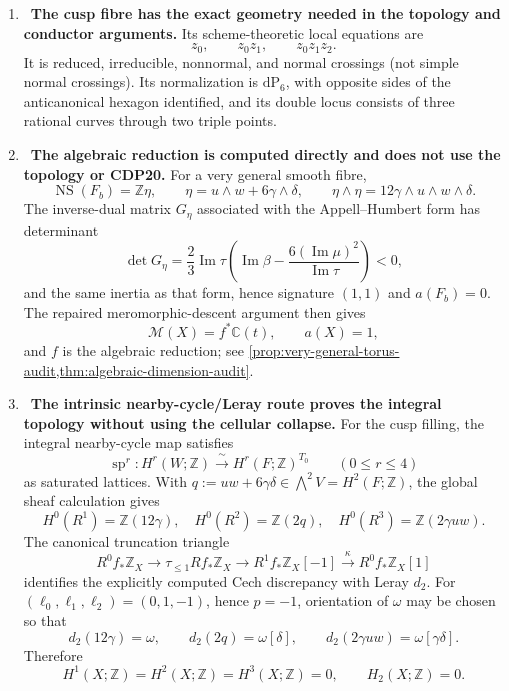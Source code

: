 \begin{enumerate}[leftmargin=1.8em,itemsep=.65em]
\item \Verified\ \textbf{The cusp fibre has the exact geometry needed in the
topology and conductor arguments.}
Its scheme-theoretic local equations are
\[
 z_0,\qquad z_0z_1,\qquad z_0z_1z_2.
\]
It is reduced, irreducible, nonnormal, and normal crossings (not simple
normal crossings).  Its normalization is \(\mathrm{dP}_6\), with opposite
sides of the anticanonical hexagon identified, and its double locus consists
of three rational curves through two triple points.

\item \Verified\ \textbf{The algebraic reduction is computed directly and
does not use the topology or CDP20.}
For a very general smooth fibre,
\[
 \operatorname{NS}(F_b)=\mathbb Z\eta,\qquad
 \eta=u\wedge w+6\gamma\wedge\delta,\qquad
 \eta\wedge\eta=12\gamma\wedge u\wedge w\wedge\delta.
\]
The inverse-dual matrix \(G_\eta\) associated with the Appell--Humbert form
has determinant
\[
 \det G_\eta=
 \frac23\operatorname{Im}\tau
 \left(\operatorname{Im}\beta-
 \frac{6(\operatorname{Im}\mu)^2}{\operatorname{Im}\tau}\right)<0,
\]
and the same inertia as that form, hence signature \((1,1)\) and
\(a(F_b)=0\).  The repaired
meromorphic-descent argument then gives
\[
 \mathcal M(X)=f^*\mathbb C(t),\qquad a(X)=1,
\]
and \(f\) is the algebraic reduction; see
\cref{prop:very-general-torus-audit,thm:algebraic-dimension-audit}.

\item \Verified\ \textbf{The intrinsic nearby-cycle/Leray route proves the
integral topology without using the cellular collapse.}
For the cusp filling, the integral nearby-cycle map satisfies
\[
 \operatorname{sp}^r:H^r(W;\mathbb Z)
   \xrightarrow{\ \sim\ }H^r(F;\mathbb Z)^{T_0}
 \qquad(0\le r\le4)
\]
as saturated lattices.  With
$q:=uw+6\gamma\delta\in\bigwedge^2V=H^2(F;\mathbb Z)$, the global sheaf calculation gives
\[
H^0(R^1)=\mathbb Z(12\gamma),\quad
H^0(R^2)=\mathbb Z(2q),\quad
H^0(R^3)=\mathbb Z(2\gamma uw).
\]
The canonical truncation triangle
\[
 R^0f_*\mathbb Z_X\longrightarrow\tau_{\le1}Rf_*\mathbb Z_X
 \longrightarrow R^1f_*\mathbb Z_X[-1]
 \xrightarrow{\kappa}R^0f_*\mathbb Z_X[1]
\]
identifies the explicitly computed Cech discrepancy with Leray \(d_2\).
For \((\ell_0,\ell_1,\ell_2)=(0,1,-1)\), hence \(p=-1\), orientation of
\(\omega\) may be chosen so that
\[
d_2(12\gamma)=\omega,\qquad
d_2(2q)=\omega[\delta],\qquad
d_2(2\gamma uw)=\omega[\gamma\delta].
\]
Therefore
\[
 H^1(X;\mathbb Z)=H^2(X;\mathbb Z)=H^3(X;\mathbb Z)=0,
 \qquad H_2(X;\mathbb Z)=0.
\]


\end{enumerate}
